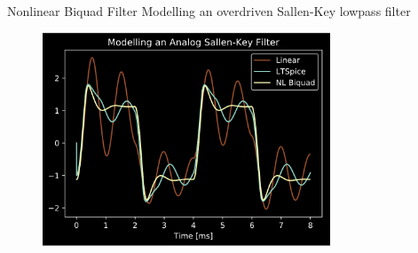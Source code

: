 \begin{frame}{Nonlinear Biquad Filter}
    Modelling an overdriven Sallen-Key lowpass filter
    \begin{figure}
        \includegraphics[height=2.5in]{../NonlinearBiquad/Pics/Spice-Compare.png}
    \end{figure}
\end{frame}
